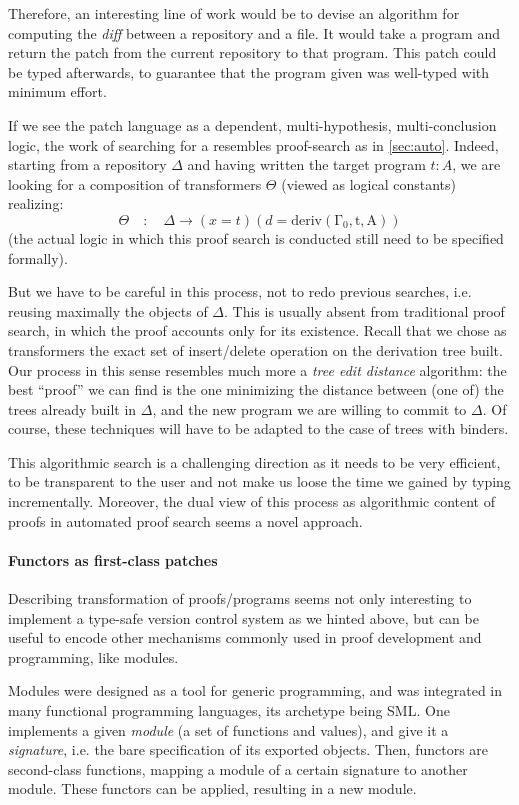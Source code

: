 \documentclass[twoside,a4paper,12pt]{article}
\newcommand{\To}{\longrightarrow}
\begin{document}
Therefore, an interesting line of work would be to devise an algorithm
for computing the \emph{diff} between a repository and a file. It
would take a program and return the patch from the current repository
to that program. This patch could be typed afterwards, to guarantee
that the program given was well-typed with minimum effort.

If we see the patch language as a dependent, multi-hypothesis,
multi-conclusion logic, the work of searching for a resembles
proof-search as in \autoref{sec:auto}. Indeed, starting from a repository
$\Delta$ and having written the target program $t : A$, we are looking
for a composition of transformers $\Theta$ (viewed as logical
constants) realizing: \[ \Theta\quad:\quad\Delta \To (x = t) (d =
\mathrm{deriv(\Gamma_0,t,A)}) \] (the actual logic in which this proof
search is conducted still need to be specified formally).

But we have to be careful in this process, not to redo previous
searches, i.e. reusing maximally the objects of $\Delta$. This is
usually absent from traditional proof search, in which the proof
accounts only for its existence. Recall that we chose as transformers
the exact set of insert/delete operation on the derivation tree built.
Our process in this sense resembles much more a \emph{tree edit
  distance} algorithm: the best ``proof'' we can find is the one
minimizing the distance between (one of) the trees already built in
$\Delta$, and the new program we are willing to commit to $\Delta$. Of
course, these techniques will have to be adapted to the case of trees
with binders.

This algorithmic search is a challenging direction as it needs to be
very efficient, to be transparent to the user and not make us loose
the time we gained by typing incrementally. Moreover, the dual view of
this process as algorithmic content of proofs in automated proof
search seems a novel approach.

\paragraph{Functors as first-class patches}

Describing transformation of proofs/programs seems not only
interesting to implement a type-safe version control system as we
hinted above, but can be useful to encode other mechanisms commonly
used in proof development and programming, like modules.

Modules were designed as a tool for generic programming, and was
integrated in many functional programming languages, its archetype
being \textsf{SML}. One implements a given \emph{module} (a set of
functions and values), and give it a \emph{signature}, i.e. the bare
specification of its exported objects. Then, \textsf{functors} are
second-class functions, mapping a module of a certain signature to
another module. These functors can be applied, resulting in a new
module.
\end{document}
